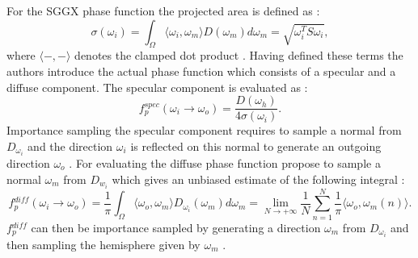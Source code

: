 For the SGGX phase function the projected area is defined as \cite[p. 4]{sggx}:
\begin{equation}
    \label{eq:projected_area}
    \sigma(\omega_i)=\int_\Omega \langle \omega_i, \omega_m \rangle D(\omega_m) d\omega_m = \sqrt{\omega_i^T S \omega_i},
\end{equation}
where $\langle -,-\rangle$ denotes the clamped dot product \cite[p. 3]{sggx}.
Having defined these terms the authors introduce the actual phase function which consists of a specular and a diffuse component.
The specular component is evaluated as \cite[p.7]{sggx}:
\begin{equation}
    f{}^{spec}_p(\omega_i \rightarrow \omega_o) = \frac{D(\omega_h)}{4 \sigma(\omega_i)}.
\end{equation}
Importance sampling the specular component requires to sample a normal from $D_{\omega_i}$ and the direction $\omega_i$ is reflected on this normal to generate an outgoing direction $\omega_o$ \cite[p. 8]{sggx}.
For evaluating the diffuse phase function \citeauthor{sggx} propose to sample a normal $\omega_m$ from $D_{w_i}$ which gives an unbiased estimate of the following integral \cite[p. 8]{sggx}:
\begin{equation}
    f{}^{diff}_p(\omega_i \rightarrow \omega_o) = \frac{1}{\pi}\int_\Omega \langle\omega_o,\omega_m\rangle D_{\omega_i}(\omega_m) d\omega_m = \lim \limits_{N \to +\infty} \frac{1}{N} \sum_{n=1}^N \frac{1}{\pi} \langle\omega_o,\omega_m(n)\rangle.
\end{equation}
$f{}^{diff}_p$ can then be importance sampled by generating a direction $\omega_m$ from $D_{\omega_i}$ and then sampling the hemisphere given by $\omega_m$ \cite[p. 8]{sggx}.

